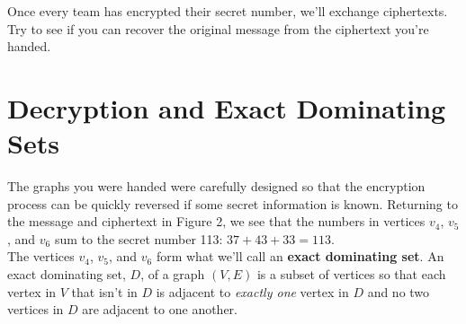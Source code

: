\documentclass[12pt]{article}
\begin{document}
\noindent Once every team has encrypted their secret number, we'll exchange ciphertexts. Try to see if you can recover the original message from the ciphertext you're handed.

\newpage

\section*{Decryption and Exact Dominating Sets}
The graphs you were handed were carefully designed so that the encryption process can be quickly reversed if some secret information is known. Returning to the message and ciphertext in Figure 2, we see that the numbers in vertices $v_4$, $v_5$, and $v_6$ sum to the secret number 113: $37 + 43 + 33 = 113$.\\

\noindent The vertices $v_4$, $v_5$, and $v_6$ form what we'll call an  \textbf{exact dominating set}. An exact dominating set, $D$, of a graph $(V, E)$ is a subset of vertices so that each vertex in $V$ that isn't in $D$ is adjacent to \textit{exactly one} vertex in $D$ and no two vertices in $D$ are adjacent to one another.
\end{document}
